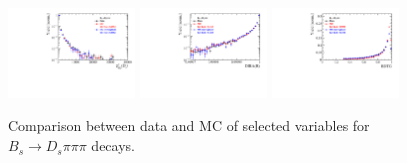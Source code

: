 \begin{figure}[h]
\includegraphics[height=!,width=0.3\textwidth]{figs/dataVsMC/norm_final/combined/Ds2KKpi_1_Ds_FDCHI2_ORIVX.pdf}
\includegraphics[height=!,width=0.3\textwidth]{figs/dataVsMC/norm_final/combined/Ds2KKpi_1_Bs_DIRA_OWNPV.pdf}
\includegraphics[height=!,width=0.3\textwidth]{figs/dataVsMC/norm_final/combined/Ds2KKpi_1_BDTG_response.pdf}


\caption{\footnotesize Comparison between data and MC of selected variables for $B_s\to D_s\pi\pi\pi$ decays.}
\label{fig:}

%
%
%
%
%




\end{figure}

